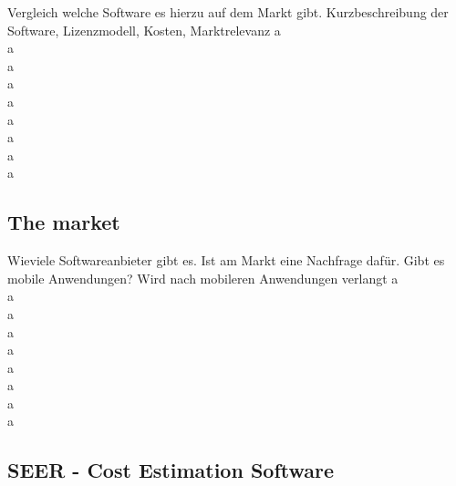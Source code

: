 Vergleich welche Software es hierzu auf dem Markt gibt. Kurzbeschreibung der Software, Lizenzmodell, Kosten, Marktrelevanz
a\\
a\\
a\\
a\\
a\\
a\\
a\\
a\\
a

\subsection{The market}

Wieviele Softwareanbieter gibt es. Ist am Markt eine Nachfrage dafür. Gibt es mobile Anwendungen? Wird nach mobileren Anwendungen verlangt
a\\
a\\
a\\
a\\
a\\
a\\
a\\
a\\
a
\subsection{SEER - Cost Estimation Software}

